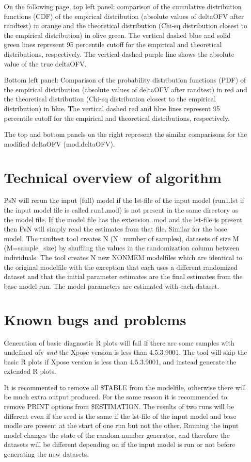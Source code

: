 On the following page, top left panel: comparison of the cumulative distribution functions (CDF) of the empirical distribution (absolute values of deltaOFV after randtest) in orange and the theoretical distribution (Chi-sq distribution closest to the empirical distribution) in olive green. The vertical dashed blue and solid green lines represent 95 percentile cutoff for the empirical and theoretical distributions, respectively. The vertical dashed purple line shows the absolute value of the true deltaOFV.

Bottom left panel: Comparison of the probability distribution functions (PDF) of the empirical distribution (absolute values of deltaOFV after randtest) in red and the theoretical distribution (Chi-sq distribution closest to the empirical  distribution) in blue. The vertical dashed red and blue lines represent 95 percentile cutoff for the empirical and theoretical distributions, respectively.

The top and bottom panels on the right represent the similar comparisons for the modified deltaOFV (mod.deltaOFV).

\section{Technical overview of algorithm}

PsN will rerun the input (full) model if the lst-file of the input model (run1.lst if the input model file is called run1.mod) is not present in the same directory as the model file. 
If the model file has the extension .mod and the lst-file is present then PsN will simply read the estimates from that file. Similar for the base model.
The randtest tool creates N (N=number of samples), datasets of size M (M=sample\_size) by shuffling the values in the randomization column between individuals. The tool creates N new NONMEM modelfiles which are identical to the original modelfile with the exception that each uses a different randomized dataset and that the initial parameter estimates are the final estimates from the base model run. The model parameters are estimated with each dataset.


\section{Known bugs and problems}
Generation of basic diagnostic R plots will fail if there are some samples with undefined ofv \emph{and} the Xpose version is less than 4.5.3.9001. The tool will skip the basic R plots if Xpose version is less than 4.5.3.9001, and instead generate the extended R plots.

It is recommented to remove all \$TABLE from the modelfile, otherwise there will be much extra output produced. For the same reason it is recommended to remove PRINT options from \$ESTIMATION. 
The results of two runs will be different even if the seed is the same if the lst-file of the input model and base modle are present at the start of one run but not the other. Running the input model changes the state of the random number generator, and therefore the datasets will be different depending on if the input model is run or not before generating the  new datasets.




